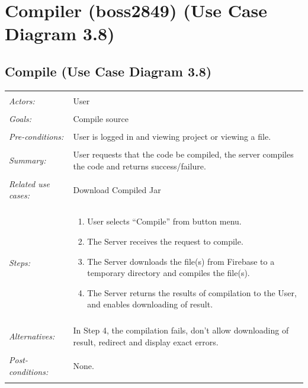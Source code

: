 \documentclass[11pt]{report}
\begin{document}
\section{Compiler (boss2849) (Use Case Diagram 3.8) }
\subsection{Compile (Use Case Diagram 3.8)}
\begin{tabular}{ p{2cm} p{12cm} }
    \hline
    \\
    \textit{Actors:} & User \\ 
    \\
    \textit{Goals:} & Compile source \\
    \\
    \textit{Pre-conditions:} & User is logged in and viewing project or viewing a file. \\
    \\
    \textit{Summary:} & User requests that the code be compiled, the server compiles the code and returns success/failure. \\
    \\
    \textit{Related use cases:} & Download Compiled Jar \\ 
    \\
    \textit{Steps:} & \begin{enumerate}
        \item User selects ``Compile'' from button menu.
        \item The Server receives the request to compile.
        \item The Server downloads the file(s) from Firebase to a temporary directory and compiles the file(s).
        \item The Server returns the results of compilation to the User, and enables downloading of result.
    \end{enumerate} \\
    \\
    \textit{Alternatives:} & In Step 4, the compilation fails, don't allow downloading of result, redirect and display exact errors. \\
    \\
    \textit{Post-conditions:} & None. \\
    \\
    \hline
\end{tabular}
\end{document}
